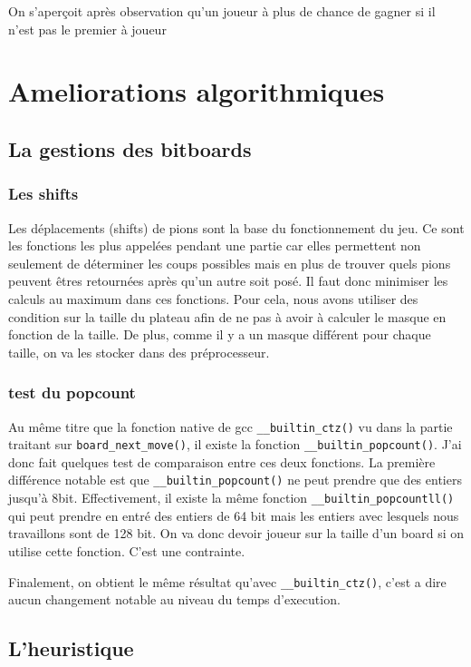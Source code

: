 \documentclass{report}
\begin{document}
On s'aperçoit après observation qu'un joueur à plus de chance de gagner si il n'est pas le premier à joueur

\chapter{Ameliorations algorithmiques}
\section{La gestions des bitboards}
\subsection{Les shifts}
Les déplacements (shifts) de pions sont la base du fonctionnement du jeu. Ce sont les fonctions les plus appelées pendant une partie car elles permettent non seulement de déterminer les coups possibles mais en plus de trouver quels pions peuvent êtres retournées après qu'un autre soit posé.
Il faut donc minimiser les calculs au maximum dans ces fonctions.
Pour cela, nous avons utiliser des condition sur la taille du plateau afin de ne pas à avoir à calculer le masque en fonction de la taille. De plus, comme il y a un masque différent pour chaque taille, on va les stocker dans des préprocesseur.

\subsection{test du popcount}

Au même titre que la fonction native de gcc \texttt{\_\_builtin\_ctz()} vu dans la partie traitant sur \texttt{board\_next\_move()}, il existe la fonction \newline\texttt{\_\_builtin\_popcount()}.
J'ai donc fait quelques test de comparaison entre ces deux fonctions. La première différence notable est que \texttt{\_\_builtin\_popcount()} ne peut prendre que des entiers jusqu’à 8bit. Effectivement, il existe la même fonction \texttt{\_\_builtin\_popcountll()} qui peut prendre en entré des entiers de 64 bit mais les entiers avec lesquels nous travaillons sont de 128 bit. On va donc devoir joueur sur la taille d’un board si on utilise cette fonction. C’est une contrainte.

Finalement, on obtient le même résultat qu'avec \texttt{\_\_builtin\_ctz()}, c'est a dire aucun changement notable au niveau du temps d'execution.
\section{L'heuristique}
\end{document}
